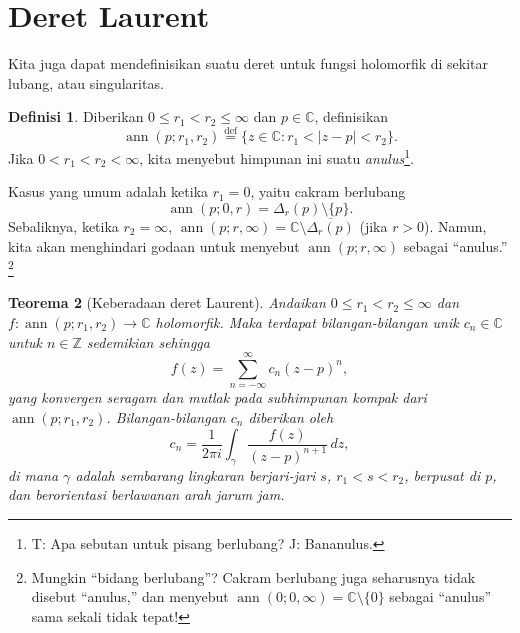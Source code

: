 \documentclass[12pt,openany]{book}
\newcommand{\ann}{\operatorname{ann}}
\newcommand{\sabs}[1]{\lvert {#1} \rvert}
\newcommand{\C}{{\mathbb{C}}}
\newcommand{\Z}{{\mathbb{Z}}}
\newcommand{\myindex}[1]{#1\index{#1}}
\newcommand{\myquote}[1]{``#1''}
\theoremstyle{plain}
\newtheorem{thm}{Teorema}[section]
\theoremstyle{remark}
\theoremstyle{definition}
\newtheorem{defn}[thm]{Definisi}
\theoremstyle{exercise}
\theoremstyle{example}
\begin{document}

\section{Deret Laurent}

Kita juga dapat mendefinisikan suatu deret untuk fungsi holomorfik di sekitar lubang, atau singularitas.

\begin{defn}
Diberikan $0 \leq r_1 < r_2 \leq \infty$ dan $p \in \C$, definisikan
%
\begin{equation*}
\ann(p;r_1,r_2)
\overset{\text{def}}{=}
\{ z \in \C : r_1 < \sabs{z - p} < r_2 \} .
\end{equation*}
Jika $0 < r_1 < r_2 < \infty$, kita menyebut himpunan ini suatu
\emph{\myindex{anulus}}\footnote{%
T\@: Apa sebutan untuk pisang berlubang?
J\@: Bananulus.}.
\end{defn}

Kasus yang umum adalah ketika $r_1 = 0$, yaitu
cakram berlubang
\begin{equation*}
\ann(p;0,r) = \Delta_r(p) \setminus \{ p \} .
\end{equation*}
Sebaliknya, ketika $r_2 = \infty$,
$\ann(p;r,\infty) = \C \setminus \overline{\Delta_{r}(p)}$ (jika $r > 0$). Namun, kita akan
menghindari godaan untuk menyebut $\ann(p;r,\infty)$ sebagai \myquote{anulus.}%
\footnote{Mungkin \myquote{bidang berlubang}? Cakram berlubang juga seharusnya tidak
disebut \myquote{anulus,} dan menyebut $\ann(0;0,\infty) = \C \setminus
\{ 0 \}$ sebagai \myquote{anulus} sama sekali tidak tepat!}

\begin{thm}[Keberadaan deret Laurent]
%
%
\label{thm:laurent}%
Andaikan $0 \leq r_1 < r_2 \leq \infty$ dan
$f \colon \ann(p;r_1,r_2) \to \C$ holomorfik.
Maka terdapat bilangan-bilangan unik $c_n \in \C$ untuk $n \in \Z$ sedemikian sehingga
%
\begin{equation*}
f(z) = \sum_{n=-\infty}^{\infty} c_n {(z-p)}^n ,
\end{equation*}
yang konvergen seragam dan mutlak pada subhimpunan kompak dari
$\ann(p;r_1,r_2)$. Bilangan-bilangan $c_n$ diberikan oleh
\begin{equation*}
c_n = 
\frac{1}{2\pi i}
\int_{\gamma}
\frac{f(z)}{{(z-p)}^{n+1}}
\,
dz  ,
\end{equation*}
di mana $\gamma$ adalah sembarang lingkaran berjari-jari $s$, $r_1 < s < r_2$, berpusat di
$p$, dan berorientasi berlawanan arah jarum jam.
\end{thm}
\end{document}
